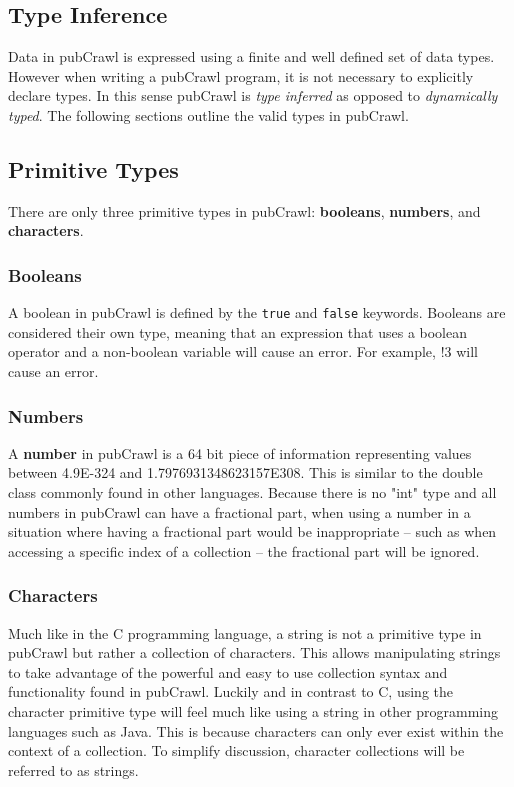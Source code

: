 \documentclass[oneside]{book}
\begin{document}
\subsection{Type Inference}
Data in pubCrawl is expressed using a finite and well defined set of data types. However when writing a pubCrawl program, it is not necessary to explicitly declare types. In this sense pubCrawl is \textit{type inferred} as opposed to \textit{dynamically typed}. The following sections outline the valid types in pubCrawl. 
\subsection{Primitive Types}
There are only three primitive types in pubCrawl: \textbf{booleans}, \textbf{numbers}, and \textbf{characters}. 

\subsubsection{Booleans}
A boolean in pubCrawl is defined by the \texttt{true} and \texttt{false} keywords. Booleans are considered their own type, meaning that an expression that uses a boolean operator and a non-boolean variable will cause an error. For example, !3 will cause an error. 

\subsubsection{Numbers}
A \textbf{number} in pubCrawl is a 64 bit piece of information representing values between 4.9E-324 and 1.7976931348623157E308. This is similar to the double class commonly found in other languages. Because there is no "int" type and all numbers in pubCrawl can have a fractional part, when using a number in a situation where having a fractional part would be inappropriate -- such as when accessing a specific index of a collection -- the fractional part will be ignored.

\subsubsection{Characters}
Much like in the C programming language, a string is not a primitive type in pubCrawl but rather a collection of characters. This allows manipulating strings to take advantage of the powerful and easy to use collection syntax and functionality found in pubCrawl. Luckily and in contrast to C, using the character primitive type will feel much like using a string in other programming languages such as Java. This is because characters can only ever exist within the context of a collection. To simplify discussion, character collections will be referred to as strings.
\end{document}
